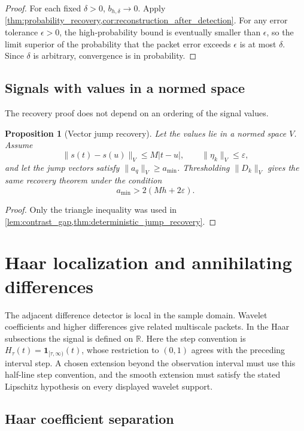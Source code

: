 \documentclass{aomart}
\newtheorem{proposition}[proposition]{Proposition}
\theoremstyle{definition}
\theoremstyle{remark}
\newcommand{\RR}{\mathbb R}
\newcommand{\one}{\mathbf 1}
\begin{document}
\begin{proof}
For each fixed \(\delta>0\), \(b_{h,\delta}\to0\). Apply \cref{thm:probability_recovery,cor:reconstruction_after_detection}. For any error tolerance \(\epsilon>0\), the high-probability bound is eventually smaller than \(\epsilon\), so the limit superior of the probability that the packet error exceeds \(\epsilon\) is at most \(\delta\). Since \(\delta\) is arbitrary, convergence is in probability.
\end{proof}

\subsection{Signals with values in a normed space}

The recovery proof does not depend on an ordering of the signal values.

\begin{proposition}[Vector jump recovery]\label{prop:vector_jump_recovery}
Let the values lie in a normed space \(V\). Assume
\[
\|s(t)-s(u)\|_V\leq M|t-u|,
\qquad
\|\eta_k\|_V\leq\varepsilon,
\]
and let the jump vectors satisfy \(\|a_q\|_V\geq a_{\min}\). Thresholding \(\|D_k\|_V\) gives the same recovery theorem under the condition
\[
a_{\min}>2(Mh+2\varepsilon).
\]
\end{proposition}

\begin{proof}
Only the triangle inequality was used in \cref{lem:contrast_gap,thm:deterministic_jump_recovery}.
\end{proof}

\section{Haar localization and annihilating differences}\label{sec:localization}

The adjacent difference detector is local in the sample domain. Wavelet coefficients and higher differences give related multiscale packets. In the Haar subsections the signal is defined on \(\RR\). Here the step convention is \(H_\tau(t)=\one_{[\tau,\infty)}(t)\), whose restriction to \((0,1)\) agrees with the preceding interval step. A chosen extension beyond the observation interval must use this half-line step convention, and the smooth extension must satisfy the stated Lipschitz hypothesis on every displayed wavelet support.

\subsection{Haar coefficient separation}
\end{document}

